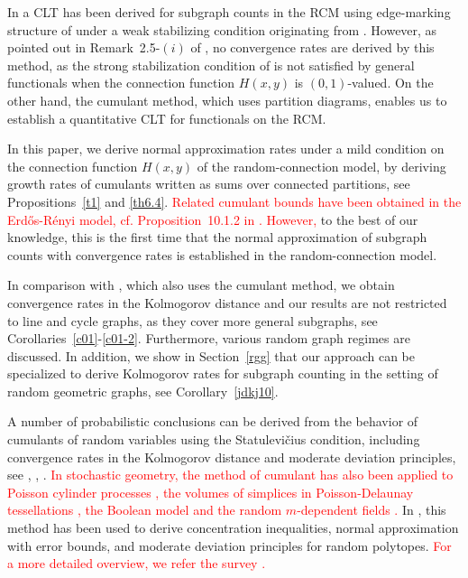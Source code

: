 \documentclass[bj,authoryear,noshowframe]{imsart}
\theoremstyle{plain}
\theoremstyle{remark}
\let\Horig\H
\begin{document}
   In \cite{can2022} a CLT has been derived for subgraph counts in the RCM
   using edge-marking structure of \cite{LNS21} 
   under a weak stabilizing condition originating from \cite{penrose01}. 
   However, as pointed out in Remark~2.5-$(i)$ of \cite{can2022},
   no convergence rates are derived by this method, as 
   the strong stabilization condition of \cite{penrose05,lachiezerey4}
   is not satisfied by general functionals
   when the connection function $H(x,y)$ is $(0,1)$-valued. 
 On the other hand, the cumulant method, which uses partition diagrams, enables us to establish a quantitative CLT for functionals on the RCM. %

 In this paper, we derive normal approximation rates under a mild condition
 on the connection function $H(x,y)$ of the random-connection model,
 by deriving growth rates of cumulants written as sums over
 connected partitions, see Propositions~\ref{t1} and \ref{th6.4}.  \textcolor{red}{Related cumulant bounds have been obtained in the {E}rd{\Horig{o}}s-{R}\'enyi model, cf. Proposition~10.1.2 in \cite{feray}. However,} to the best of our knowledge, this is the first time that the normal approximation
 of subgraph counts with convergence rates is established
 in the random-connection model.

 In comparison with \cite{khorunzhiy}, which also uses the cumulant method, 
 we obtain convergence rates in the Kolmogorov distance and our results are 
 not restricted to line and cycle graphs, as they cover more general subgraphs,
 see Corollaries~\ref{c01}-\ref{c01-2}. 
 Furthermore, various random graph regimes are discussed.
 In addition,
   we show in Section~\ref{rgg} that our approach can be
   specialized to derive Kolmogorov rates for
   subgraph counting in the setting of random geometric graphs,
   see Corollary~\ref{jdkj10}. 

 A number of probabilistic conclusions can be derived
 from the behavior of cumulants of random variables using the 
Statulevi\v{c}ius condition, 
 including convergence rates in the Kolmogorov distance
 and moderate deviation principles, see
 \cite{saulis},
 \cite{doring},
 \cite{doering}. \textcolor{red}{In stochastic geometry, the method of cumulant has also been applied to Poisson cylinder processes \cite{heinrich09}, the volumes of simplices in Poisson-Delaunay tessellations \cite{thale21}, the Boolean model \cite{heinrich} and the random $m$-dependent fields \cite{gotze95}.} In \cite{grotethale18,thale18}, 
 this method has been used to derive concentration inequalities, normal approximation with error bounds, and moderate deviation principles for random polytopes. \textcolor{red}{For a more detailed overview, we refer the survey \cite{doering}.}
 
\end{document}
